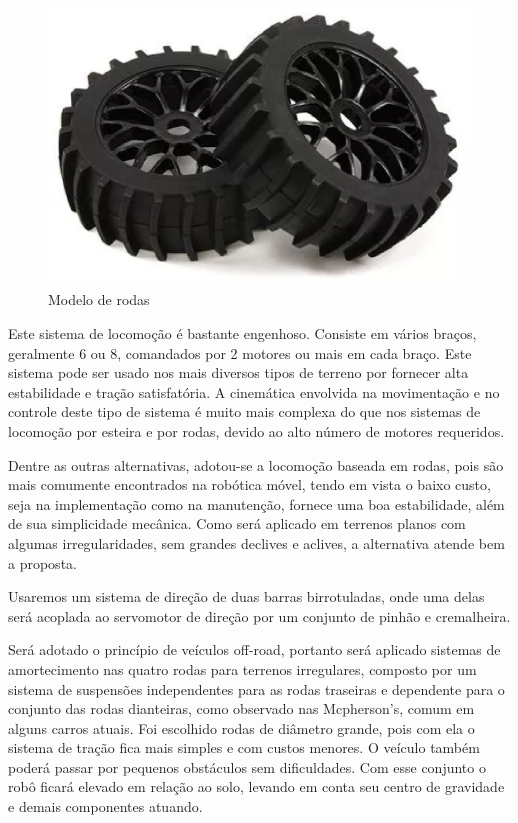       
      \begin{figure}[h]
	\centering
	\label{WHEELS}
	  \includegraphics[keepaspectratio=true,scale=0.3]{figuras/wheels.eps}
	\caption{Modelo de rodas}
      \end{figure}

      
      Este sistema de locomoção é bastante engenhoso. Consiste em vários braços, geralmente 6 ou 8, comandados por 2 motores ou 
      mais em cada braço. Este sistema pode ser usado nos mais diversos tipos de terreno por fornecer alta estabilidade e tração 
      satisfatória. A cinemática envolvida na movimentação e no controle deste tipo de sistema é muito mais complexa do que nos 
      sistemas de locomoção por esteira e por rodas, devido ao alto número de motores requeridos.
      
      
      
      Dentre as outras alternativas, adotou-se a locomoção baseada em rodas, pois são mais comumente encontrados na robótica móvel, 
      tendo em vista o baixo custo, seja na implementação como na manutenção, fornece uma boa estabilidade, além de sua simplicidade
      mecânica. Como será aplicado em terrenos planos com algumas irregularidades, sem grandes declives e aclives, a alternativa 
      atende bem a proposta. \cite{matsumura2014desenvolvimento}
      
      Usaremos um sistema de direção de duas barras birrotuladas, onde uma delas será acoplada ao servomotor de direção por um 
      conjunto de pinhão e cremalheira.
      
      Será adotado o princípio de veículos off-road, portanto será aplicado sistemas de amortecimento nas quatro rodas para terrenos 
      irregulares, composto por um sistema de suspensões independentes para as rodas traseiras e dependente para o conjunto das 
      rodas dianteiras, como observado nas Mcpherson's, comum em alguns carros atuais. Foi escolhido rodas de diâmetro grande, 
      pois com ela o sistema de tração fica mais simples e com custos menores. O veículo também poderá passar por pequenos 
      obstáculos sem dificuldades. Com esse conjunto o robô ficará elevado em relação ao solo, levando em conta seu centro 
      de gravidade e demais componentes atuando.
      

